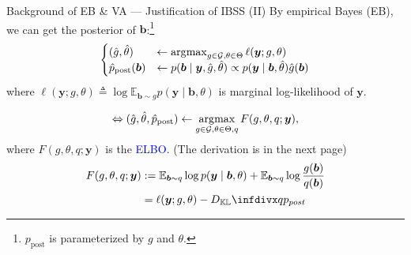 \documentclass[10pt]{beamer}
\begin{document}
\begin{frame}{Background of EB \& VA --- \normalsize Justification of IBSS (II)}
    By empirical Bayes (EB), we can get the posterior of $\bm{b}$:\footnote{$p_\text{post}$ is parameterized by $g$ and $\theta$.}
    \begin{align}
    \begin{cases}
        (\hat{g}, \hat{\theta}) 
        & \gets \operatorname*{\arg\!max}_{g \in \mathcal{G}, \theta \in \Theta} \ell(\bm{y}; g, \theta) \\
        \hat{p}_{\text{post}}(\bm{b}) 
        & \gets p(\bm{b} \mid \bm{y}, \hat{g}, \hat{\theta}) \propto p(\bm{y} \mid \bm{b}, \hat{\theta}) \hat{g}(\bm{b})
    \end{cases}
    \end{align}
    where $\ell(\bm{y}; g, \theta)\triangleq \log \mathbb{E}_{\bm{b}\sim g} p(\bm{y} \mid \bm{b}, \theta)$ is marginal log-likelihood of $\bm{y}$. 

    \begin{gather}
        \Leftrightarrow (\hat{g}, \hat{\theta},\hat{p}_{\text {post}})  \gets \operatorname*{\arg\!max}_{g \in \mathcal{G}, \theta \in \Theta, q} F(g, \theta, q ; \bm{y}), \label{eq:unconstrainteb}
    \end{gather}
    where $F(g, \theta, q ; \bm{y})$ is the \textcolor{blue}{ELBO}. (The derivation is in the next page)
    \begin{align}
        F(g,\theta,q;\bm{y}) 
        & := \mathbb{E}_{\bm{b}\sim q} \log p(\bm{y}\mid\bm{b},\theta) + \mathbb{E}_{\bm{b}\sim q}\log\frac{g(\bm{b})}{q(\bm{b})} \label{eq:elbo}\\
        & = \ell(\bm{y};g,\theta) - \infdiv{q}{p_{post}}
    \end{align}

\end{frame}
\end{document}
